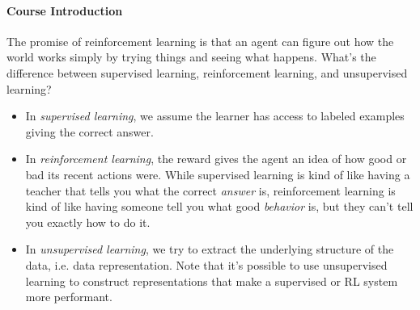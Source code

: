 \documentclass[12pt]{article}
\begin{document}
\paragraph{Course Introduction} The promise of reinforcement learning is that an agent can figure out how the world works simply by trying things and seeing what happens. What's the difference between supervised learning, reinforcement learning, and unsupervised learning?
\begin{itemize}
\item In \emph{supervised learning}, we assume the learner has access to labeled   examples giving the correct answer.
\item In \emph{reinforcement learning}, the reward gives the agent an idea of how good or bad its recent actions were. While supervised learning is kind of like having a teacher that tells you what the correct \emph{answer} is, reinforcement learning is kind of like having someone tell you what good \emph{behavior} is, but they can't tell you exactly how to do it.
\item In \emph{unsupervised learning}, we try to extract the underlying structure of the data, i.e. data representation. Note that it's possible to use unsupervised learning to construct representations that make a supervised or RL system more performant.
\end{itemize}
\end{document}
